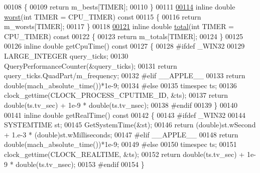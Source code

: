 \begin{DoxyCode}
00108 \textcolor{keyword}{  }\{
00109     \textcolor{keywordflow}{return} m\_bests[TIMER];
00110   \}
00111 
\hyperlink{class_eigen_1_1_bench_timer_ab912bf8bcae22898c85d907f0810173e}{00114}   \textcolor{keyword}{inline} \textcolor{keywordtype}{double} \hyperlink{class_eigen_1_1_bench_timer_ab912bf8bcae22898c85d907f0810173e}{worst}(\textcolor{keywordtype}{int} TIMER = CPU\_TIMER)\textcolor{keyword}{ const}
00115 \textcolor{keyword}{  }\{
00116     \textcolor{keywordflow}{return} m\_worsts[TIMER];
00117   \}
00118 
\hyperlink{class_eigen_1_1_bench_timer_af341aa613dba2d4a3d167093197e4e7a}{00121}   \textcolor{keyword}{inline} \textcolor{keywordtype}{double} \hyperlink{class_eigen_1_1_bench_timer_af341aa613dba2d4a3d167093197e4e7a}{total}(\textcolor{keywordtype}{int} TIMER = CPU\_TIMER)\textcolor{keyword}{ const}
00122 \textcolor{keyword}{  }\{
00123     \textcolor{keywordflow}{return} m\_totals[TIMER];
00124   \}
00125 
00126   \textcolor{keyword}{inline} \textcolor{keywordtype}{double} getCpuTime()\textcolor{keyword}{ const}
00127 \textcolor{keyword}{  }\{
00128 \textcolor{preprocessor}{#ifdef \_WIN32}
00129     LARGE\_INTEGER query\_ticks;
00130     QueryPerformanceCounter(&query\_ticks);
00131     \textcolor{keywordflow}{return} query\_ticks.QuadPart/m\_frequency;
00132 \textcolor{preprocessor}{#elif \_\_APPLE\_\_}
00133     \textcolor{keywordflow}{return} double(mach\_absolute\_time())*1e-9;
00134 \textcolor{preprocessor}{#else}
00135     timespec ts;
00136     clock\_gettime(CLOCK\_PROCESS\_CPUTIME\_ID, &ts);
00137     \textcolor{keywordflow}{return} double(ts.tv\_sec) + 1e-9 * double(ts.tv\_nsec);
00138 \textcolor{preprocessor}{#endif}
00139   \}
00140 
00141   \textcolor{keyword}{inline} \textcolor{keywordtype}{double} getRealTime()\textcolor{keyword}{ const}
00142 \textcolor{keyword}{  }\{
00143 \textcolor{preprocessor}{#ifdef \_WIN32}
00144     SYSTEMTIME st;
00145     GetSystemTime(&st);
00146     \textcolor{keywordflow}{return} (\textcolor{keywordtype}{double})st.wSecond + 1.e-3 * (double)st.wMilliseconds;
00147 #elif \_\_APPLE\_\_
00148     \textcolor{keywordflow}{return} \textcolor{keywordtype}{double}(mach\_absolute\_time())*1e-9;
00149 \textcolor{preprocessor}{#else}
00150     timespec ts;
00151     clock\_gettime(CLOCK\_REALTIME, &ts);
00152     \textcolor{keywordflow}{return} double(ts.tv\_sec) + 1e-9 * double(ts.tv\_nsec);
00153 \textcolor{preprocessor}{#endif}
00154   \}

\end{DoxyCode}
